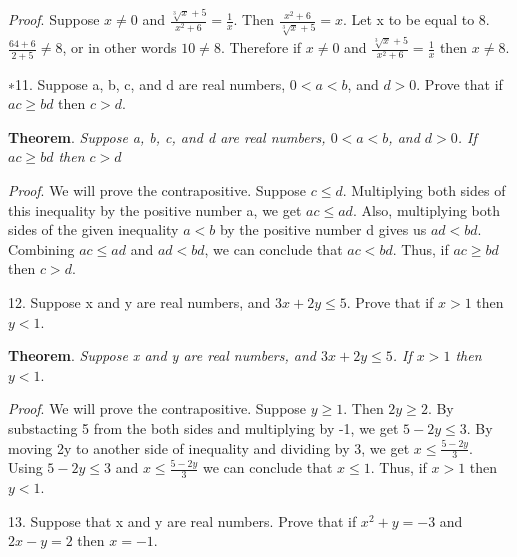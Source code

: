 \documentclass{article}
\begin{document}
\vspace{20pt}

\textit{Proof}. Suppose $x \neq 0$ and $\frac{\sqrt[3]{x} + 5}{x^2 + 6} = \frac{1}{x}$.
Then $\frac{x^2 + 6}{\sqrt[3]{x} + 5} = {x}$. Let x to be equal to 8.
$\frac{64 + 6}{2 + 5} \neq 8$, or in other words $10 \neq 8$.
Therefore if $x \neq 0$ and $\frac{\sqrt[3]{x} + 5}{x^2 + 6} = \frac{1}{x}$ then $x \neq 8$.

\vspace{30pt}

∗11. Suppose a, b, c, and d are real numbers, $0 < a < b$, and $d > 0$.
Prove that if $ac \geq bd$ then $c > d$.

\vspace{20pt}

\textbf{Theorem}. \textit{Suppose a, b, c, and d are real numbers, $0 < a < b$, and $d > 0$. If $ac \geq bd$ then $c > d$}

\textit{Proof}. We will prove the contrapositive. Suppose $c \leq d$. Multiplying both sides of this inequality by the positive number a,
we get $ac \leq ad$. Also, multiplying both sides of the given inequality $a < b$ by the positive number d gives us $ad < bd$.
Combining $ac \leq ad$ and $ad < bd$, we can conclude that $ac < bd$. Thus, if $ac \geq bd$ then $c > d$.

\vspace{30pt}

12. Suppose x and y are real numbers, and $3x + 2y \leq 5$. Prove that if $x > 1$ then $y < 1$.

\vspace{20pt}

\textbf{Theorem}. \textit{Suppose x and y are real numbers, and $3x + 2y \leq 5$. If $x > 1$ then $y < 1$}.

\textit{Proof}. We will prove the contrapositive. Suppose $y \geq 1$. Then $2y \geq 2$.
By substacting 5 from the both sides and multiplying by -1, we get $5 - 2y \leq 3$.
By moving 2y to another side of inequality and dividing by 3, we get $x \leq \frac{5 - 2y}{3}$.
Using $5 - 2y \leq 3$ and $x \leq \frac{5 - 2y}{3}$ we can conclude that $x \leq 1$. Thus, if $x > 1$ then $y < 1$.

\vspace{30pt}

13. Suppose that x and y are real numbers. Prove that if $x^2 + y = -3$ and $2x - y = 2$ then $x = -1$.

\vspace{20pt}
\end{document}
